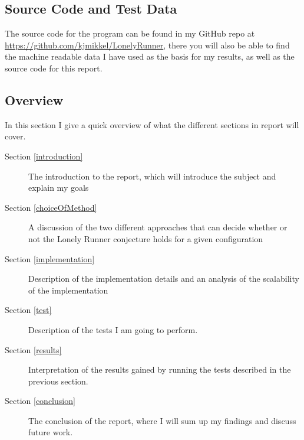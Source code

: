 \subsection{Source Code and Test Data}
The source code for the program can be found in my GitHub repo at \underline{https://github.com/kjmikkel/LonelyRunner}, there you will also be able to find the machine readable data I have used as the basis for my results, as well as the source code for this report.

\subsection{Overview}
In this section I give a quick overview of what the different sections in report will cover.
\begin{description}
\item[Section \ref{introduction}] The introduction to the report, which will introduce the subject and explain my goals
\item[Section \ref{choiceOfMethod}] A discussion of the two different approaches that can decide whether or not the Lonely Runner conjecture holds for a given configuration
\item[Section \ref{implementation}] Description of the implementation details and an analysis of the scalability of the implementation
\item[Section \ref{test}] Description of the tests I am going to perform.
\item[Section \ref{results}] Interpretation of the results gained by running the tests described in the previous section.
\item[Section \ref{conclusion}] The conclusion of the report, where I will sum up my findings and discuss future work.
\end{description}
